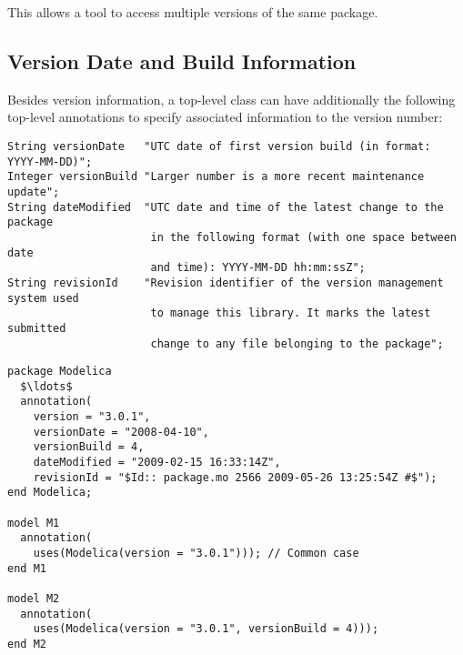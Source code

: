 This allows a tool to access multiple versions of the same package.

\subsection{Version Date and Build Information}\label{version-date-and-build-information}

Besides version information, a top-level class can have additionally the following top-level annotations to specify associated information to the version number:%
\begin{lstlisting}[language=modelica]
String versionDate   "UTC date of first version build (in format: YYYY-MM-DD)";
Integer versionBuild "Larger number is a more recent maintenance update";
String dateModified  "UTC date and time of the latest change to the package
                      in the following format (with one space between date
                      and time): YYYY-MM-DD hh:mm:ssZ";
String revisionId    "Revision identifier of the version management system used
                      to manage this library. It marks the latest submitted
                      change to any file belonging to the package";
\end{lstlisting}%

\begin{example}
\begin{lstlisting}[language=modelica,mathescape=false]
package Modelica
  $\ldots$
  annotation(
    version = "3.0.1",
    versionDate = "2008-04-10",
    versionBuild = 4,
    dateModified = "2009-02-15 16:33:14Z",
    revisionId = "$Id:: package.mo 2566 2009-05-26 13:25:54Z #$");
end Modelica;

model M1
  annotation(
    uses(Modelica(version = "3.0.1"))); // Common case
end M1

model M2
  annotation(
    uses(Modelica(version = "3.0.1", versionBuild = 4)));
end M2
\end{lstlisting}
\end{example}

